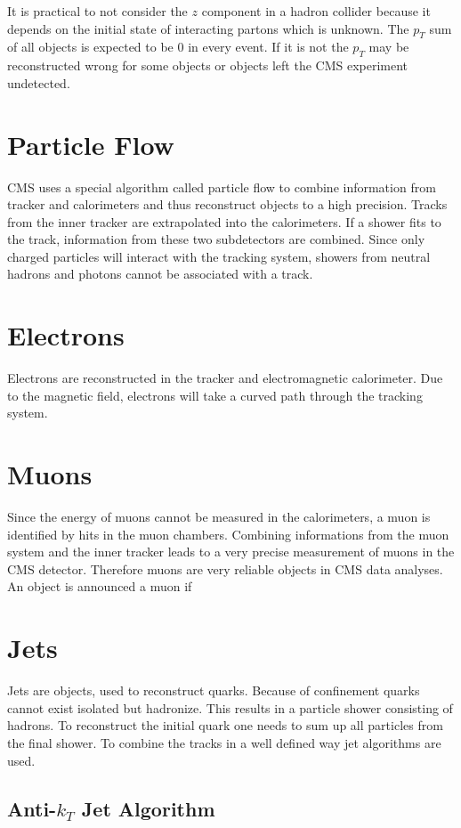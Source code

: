 	\noindent It is practical to not consider the $z$ component in a hadron collider because it depends on the initial state of interacting partons which is unknown. The $p_T$ sum of all objects is expected to be $0$ in every event. If it is not the $p_T$ may be reconstructed wrong for some objects or objects left the CMS experiment undetected.
\section{Particle Flow}
	CMS uses a special algorithm called particle flow \cite{particleflow} to combine information from tracker and calorimeters and thus reconstruct objects to a high precision. Tracks from the inner tracker are extrapolated into the calorimeters. If a shower fits to the track, information from these two subdetectors are combined. Since only charged particles will interact with the tracking system, showers from neutral hadrons and photons cannot be associated with a track.
\section{Electrons}
	Electrons are reconstructed in the tracker and electromagnetic calorimeter. Due to the magnetic field, electrons will take a curved path through the tracking system.
\section{Muons}
	Since the energy of muons cannot be measured in the calorimeters, a muon is identified by hits in the muon chambers. Combining informations from the muon system and the inner tracker leads to a very precise measurement of muons in the CMS detector. Therefore muons are very reliable objects in CMS data analyses. An object is announced a muon if %
\section{Jets}
	Jets are objects, used to reconstruct quarks. Because of confinement quarks cannot exist isolated but hadronize. This results in a particle shower consisting of hadrons. To reconstruct the initial quark one needs to sum up all particles from the final shower. To combine the tracks in a well defined way jet algorithms are used.

\subsection{Anti-$k_T$ Jet Algorithm}

